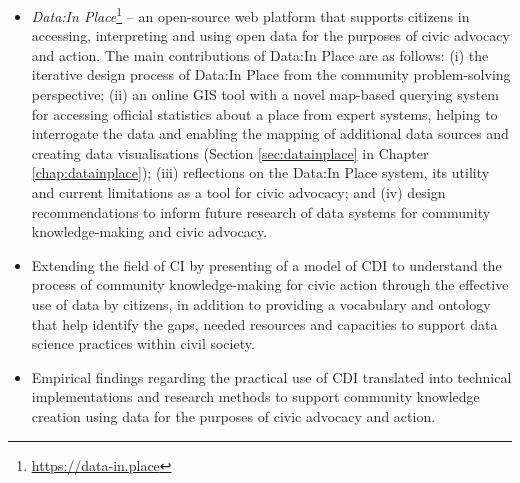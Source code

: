 \begin{introduction}
\begin{itemize}
\item\textit{Data:In Place}\footnote{\url{https://data-in.place}} -- an open-source web platform that supports citizens in accessing, interpreting and using open data for the purposes of civic advocacy and action. The main contributions of Data:In Place are as follows: (i) the iterative design process of Data:In Place from the community problem-solving perspective; (ii) an online GIS tool with a novel map-based querying system for accessing official statistics about a place from expert systems, helping to interrogate the data and enabling the mapping of additional data sources and creating data visualisations (Section \ref{sec:datainplace} in Chapter \ref{chap:datainplace}); (iii) reflections on the Data:In Place system, its utility and current limitations as a tool for civic advocacy; and (iv) design recommendations to inform future research of data systems for community knowledge-making and civic advocacy.

\item Extending the field of CI by presenting of a model of CDI to understand the process of community knowledge-making for civic action through the effective use of data by citizens, in addition to providing a vocabulary and ontology that help identify the gaps, needed resources and capacities to support data science practices within civil society.

\item Empirical findings regarding the practical use of CDI translated into technical implementations and research methods to support community knowledge creation using data for the purposes of civic advocacy and action.
\end{itemize}
\clearpage


\end{introduction}
